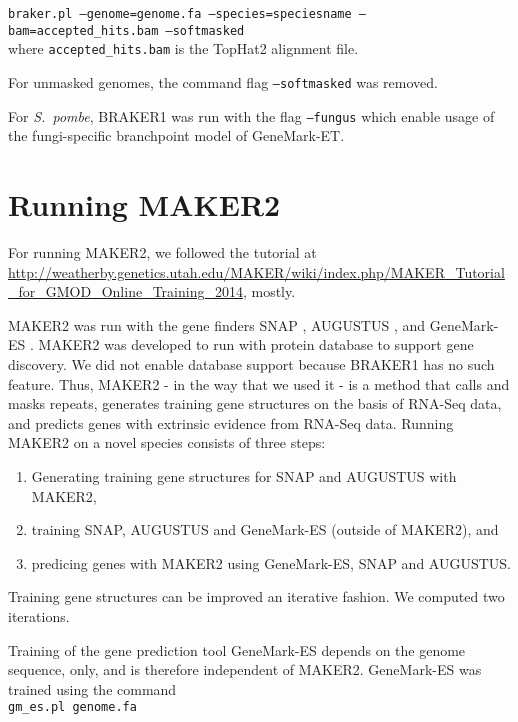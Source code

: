 \documentclass[a4paper,10pt]{report}
\begin{document}
\noindent \texttt{braker.pl --genome=genome.fa --species=speciesname --bam=accepted\_hits.bam --softmasked}\\

\noindent where \texttt{accepted\_hits.bam} is the TopHat2 alignment file.

\noindent For unmasked genomes, the command flag \texttt{--softmasked} was removed.

\noindent For \textit{S.~pombe}, BRAKER1 was run with the flag \texttt{--fungus} which enable usage of the fungi-specific branchpoint model of GeneMark-ET.

\section{Running MAKER2}

For running MAKER2, we followed the tutorial at \url{http://weatherby.genetics.utah.edu/MAKER/wiki/index.php/MAKER_Tutorial_for_GMOD_Online_Training_2014}, mostly.

MAKER2 was run with the gene finders SNAP \cite{SNAP}, AUGUSTUS \cite{AUGUSTUS}, and GeneMark-ES \cite{GeneMark-ES}. MAKER2 was developed to run with protein database to support gene discovery. We did not enable database support because BRAKER1 has no such feature. Thus, MAKER2 - in the way that we used it - is a method that calls and masks repeats, generates training gene structures on the basis of RNA-Seq data, and predicts genes with extrinsic evidence from RNA-Seq data. Running MAKER2 on a novel species consists of three steps: 

\begin{enumerate}
 \item Generating training gene structures for SNAP and AUGUSTUS with MAKER2,
 \item training SNAP, AUGUSTUS and GeneMark-ES (outside of MAKER2), and
 \item predicing genes with MAKER2 using GeneMark-ES, SNAP and AUGUSTUS.
\end{enumerate}

\noindent Training gene structures can be improved an iterative fashion. We computed two iterations.

Training of the gene prediction tool GeneMark-ES depends on the genome sequence, only, and is therefore independent of MAKER2. GeneMark-ES was trained using the command\\

\noindent \texttt{gm\_es.pl genome.fa}
\end{document}
